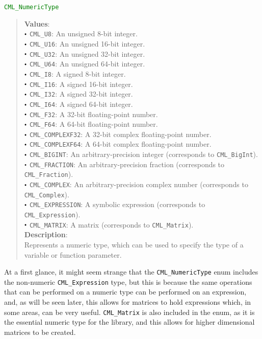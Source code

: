 \documentclass[a4paper,oneside,8pt]{extarticle}
\newcommand{\enum}[1]{
  \noindent\textcolor{green}{\texttt{#1}}
  \vspace{-0.3em}
}
\renewcommand{\dot}{\raisebox{0.3ex}{\scalebox{0.6}{$\bullet$}}}
\theoremstyle{definition}
\begin{document}
\enum{CML\_NumericType}
\begin{quote}
  \textbf{Values}: \\
  $\dot$ \texttt{CML\_U8}: An unsigned 8-bit integer. \\
  $\dot$ \texttt{CML\_U16}: An unsigned 16-bit integer. \\
  $\dot$ \texttt{CML\_U32}: An unsigned 32-bit integer. \\
  $\dot$ \texttt{CML\_U64}: An unsigned 64-bit integer. \\
  $\dot$ \texttt{CML\_I8}: A signed 8-bit integer. \\
  $\dot$ \texttt{CML\_I16}: A signed 16-bit integer. \\
  $\dot$ \texttt{CML\_I32}: A signed 32-bit integer. \\
  $\dot$ \texttt{CML\_I64}: A signed 64-bit integer. \\
  $\dot$ \texttt{CML\_F32}: A 32-bit floating-point number. \\
  $\dot$ \texttt{CML\_F64}: A 64-bit floating-point number. \\
  $\dot$ \texttt{CML\_COMPLEXF32}: A 32-bit complex floating-point number. \\
  $\dot$ \texttt{CML\_COMPLEXF64}: A 64-bit complex floating-point number. \\
  $\dot$ \texttt{CML\_BIGINT}: An arbitrary-precision integer (corresponds to \texttt{CML\_BigInt}). \\
  $\dot$ \texttt{CML\_FRACTION}: An arbitrary-precision fraction (corresponds to \texttt{CML\_Fraction}). \\
  $\dot$ \texttt{CML\_COMPLEX}: An arbitrary-precision complex number (corresponds to \texttt{CML\_Complex}). \\
  $\dot$ \texttt{CML\_EXPRESSION}: A symbolic expression (corresponds to \texttt{CML\_Expression}). \\
  $\dot$ \texttt{CML\_MATRIX}: A matrix (corresponds to \texttt{CML\_Matrix}). \\

  \vspace{-0.75em}
  \textbf{Description}: \\
  Represents a numeric type, which can be used to specify the type of a variable or function parameter. \\
\end{quote}

At a first glance, it might seem strange that the \texttt{CML\_NumericType} enum includes the non-numeric \texttt{CML\_Expression} type, but this is because the same operations that can be performed on a numeric type can be performed on an expression, and, as will be seen later, this allows for matrices to hold expressions which, in some areas, can be very useful. \texttt{CML\_Matrix} is also included in the enum, as it is the essential numeric type for the library, and this allows for higher dimensional matrices to be created.
\end{document}
